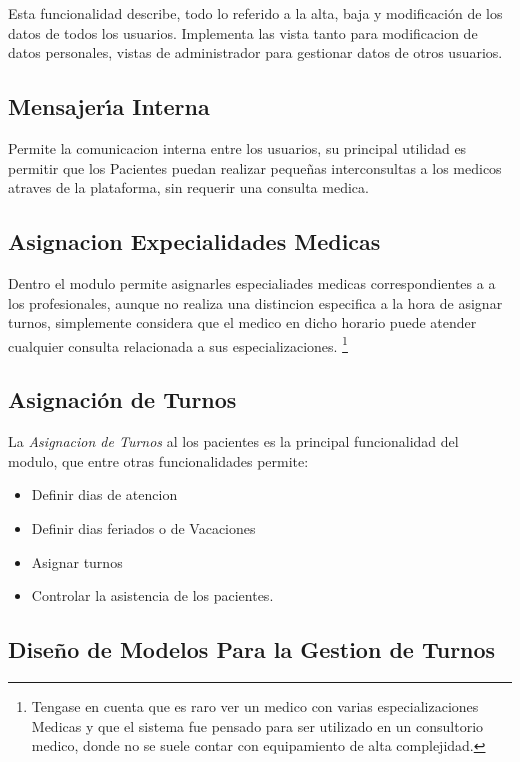 Esta funcionalidad describe, todo lo referido a la alta, baja y modificaci\'on de 
los datos de todos los usuarios. Implementa las vista tanto para modificacion de 
datos personales, vistas de administrador para gestionar datos de otros usuarios. 


\subsection{Mensajer\'{\i}a Interna}

Permite la comunicacion interna entre los usuarios, su principal utilidad es 
permitir que los Pacientes puedan realizar peque\~nas interconsultas a los 
medicos atraves de la plataforma, sin requerir una consulta medica.

\subsection{Asignacion Expecialidades Medicas}

Dentro el modulo permite asignarles especialiades medicas correspondientes a 
a los profesionales, aunque no realiza una distincion especifica a la hora de 
asignar turnos, simplemente considera que el medico en dicho horario puede 
atender cualquier consulta relacionada a sus especializaciones. \footnote{
Tengase en cuenta que es raro ver un medico con varias especializaciones Medicas
y que el sistema fue pensado para ser utilizado en un consultorio medico, donde
no se suele contar con equipamiento de alta complejidad.}


\subsection{Asignaci\'on de Turnos}  

La \textit{Asignacion de Turnos} al los pacientes es la principal funcionalidad 
del modulo, que entre otras funcionalidades permite:

\begin{itemize}
    \item Definir dias de atencion
    \item Definir dias feriados o de Vacaciones     
    \item Asignar turnos
    \item Controlar la asistencia de los pacientes.    
\end{itemize}


\subsection{Dise\~no de Modelos Para la Gestion de Turnos}

